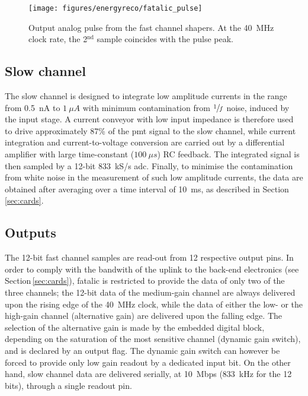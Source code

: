 \begin{figure}[!t]
  \centering
  \texttt{[image: figures/energyreco/fatalic\_pulse]}
  \caption{Output analog pulse from the fast channel shapers. At the \SI{40}{MHz} clock rate, the 2$^\text{nd}$ sample coincides with the pulse peak.\label{fig:pulse}}
\end{figure}

\subsection{Slow channel}
The slow channel is designed to integrate low amplitude currents in the range from \SI{0.5}{nA} to $\SI{1}{\mu A}$ with minimum contamination
from $\sfrac{1}{f}$ noise, induced by the input stage. A current conveyor with low input impedance is therefore used to drive approximately 87\% 
of the \gls{pmt} signal to the slow channel, while current integration and current-to-voltage conversion are carried out by a differential 
amplifier with large time-constant ($\SI{100}{\mu s}$) RC feedback. The integrated signal is then sampled by a 12-bit \SI{833}{kS/s} \gls{adc}. 
Finally, to minimise the contamination from white noise in the measurement of such low amplitude currents, the data are obtained after averaging
over a time interval of \SI{10}{ms}, as described in Section\,\ref{sec:cards}.

\subsection{Outputs}
\label{sec:output}

The 12-bit fast channel samples are read-out from 12 respective output pins. In order to comply with the bandwith of the
uplink to the back-end electronics (see Section\,\ref{sec:cards}), \gls{fatalic} is restricted to provide the data of only 
two of the three channels; the 12-bit data of the medium-gain channel are always delivered upon the rising edge of the \SI{40}{MHz} 
clock, while the data of either the low- or the high-gain channel (alternative gain) are delivered upon the falling edge. 
The selection of the alternative gain is made by the embedded digital block, depending on the saturation of the most sensitive 
channel (dynamic gain switch), and is declared by an output flag. The dynamic gain switch can however be forced to provide 
only low gain readout by a dedicated input bit. On the other hand, slow channel data are delivered serially, at \SI{10}{Mbps} 
(\SI{833}{kHz} for the 12 bits), through a single readout pin.


